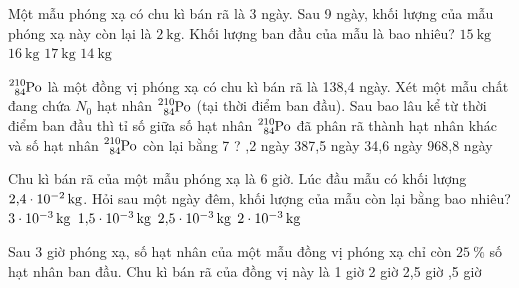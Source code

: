 \begin{ex}
	Một mẫu phóng xạ có chu kì bán rã là 3 ngày. Sau 9 ngày, khối lượng của mẫu phóng xạ này còn lại là $\SI{2}{\kilogram}$. Khối lượng ban đầu của mẫu là bao nhiêu?
	\choice
	{$\SI{15}{\kilogram}$}
	{\True $\SI{16}{\kilogram}$}
	{$\SI{17}{\kilogram}$}
	{$\SI{14}{\kilogram}$}
	\loigiai{
		
	}
\end{ex}
\begin{ex}
	$\ce{_{84}^{210}Po}$ là một đồng vị phóng xạ có chu kì bán rã là 138,4 ngày. Xét một mẫu chất đang chứa $N_0$ hạt nhân $\ce{_{84}^{210}Po}$ (tại thời điểm ban đầu). Sau bao lâu kể từ thời điểm ban đầu thì tỉ số giữa số hạt nhân $\ce{_{84}^{210}Po}$ đã phân rã thành hạt nhân khác và số hạt nhân $\ce{_{84}^{210}Po}$ còn lại bằng 7 ?
	\choice
	{,2 ngày}
	{387,5 ngày}
	{34,6 ngày}
	{968,8 ngày}
\end{ex}
\begin{ex}
	Chu kì bán rã của một mẫu phóng xạ là 6 giờ. Lúc đầu mẫu có khối lượng $\SI{2.4E-2}{\kilogram}$. Hỏi sau một ngày đêm, khối lượng của mẫu còn lại bằng bao nhiêu?
	\choice
	{$\SI{3E-3}{\kilogram}$}
	{\True $\SI{1.5E-3}{\kilogram}$}
	{$\SI{2.5E-3}{\kilogram}$}
	{$\SI{2E-3}{\kilogram}$}
	\loigiai{}
\end{ex}
\begin{ex}
	Sau 3 giờ phóng xạ, số hạt nhân của một mẫu đồng vị phóng xạ chỉ còn $\SI{25}{\percent}$ số hạt nhân ban đầu. Chu kì bán rã của đồng vị này là
	\choice
	{1 giờ}
	{2 giờ}
	{2,5 giờ}
	{,5 giờ}
	\loigiai{}
\end{ex}
